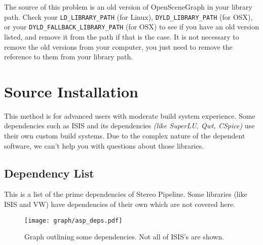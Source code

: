 The source of this problem is an old version of OpenSceneGraph in
your library path. Check your \verb#LD_LIBRARY_PATH# (for Linux),
\verb#DYLD_LIBRARY_PATH# (for OSX), or your \verb#DYLD_FALLBACK_LIBRARY_PATH#
(for OSX) to see if you have an old version listed, and remove it
from the path if that is the case. It is not necessary to remove the
old versions from your computer, you just need to remove the reference
to them from your library path.

\newpage

\section{\label{sec:Source-Installation}Source Installation}

This method is for advanced users with moderate build system
experience. Some dependencies such as ISIS and its dependencies
\emph{(like SuperLU, Qwt, CSpice)} use their own custom build systems. 
Due to the complex nature of the dependent software, we can't help you 
with questions about those libraries.

\subsection{Dependency List}

This is a list of the prime dependencies of Stereo Pipeline. Some libraries
(like \ac{ISIS} and \ac{VW}) have dependencies of their own which are not covered here.

\begin{figure}[h]
  \centering
  \texttt{[image: graph/asp\_deps.pdf]}
  \caption{Graph outlining some dependencies. Not all of ISIS's are shown.}
\end{figure}

